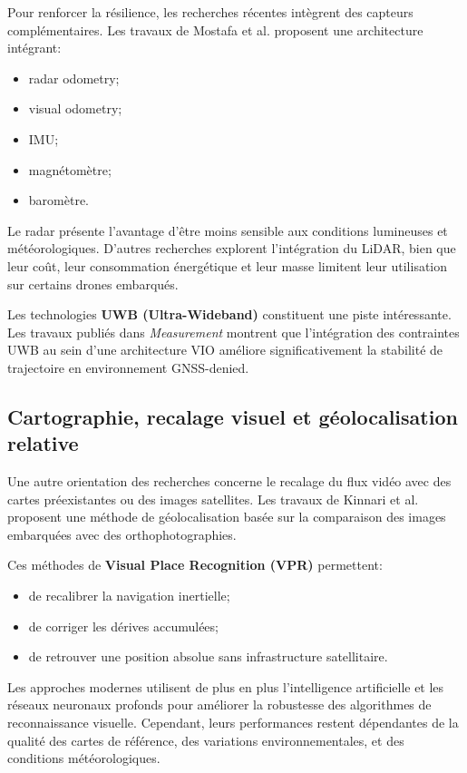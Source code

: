 \documentclass[12pt, a4paper, twoside, openright]{report}
\begin{document}
Pour renforcer la résilience, les recherches récentes intègrent des capteurs complémentaires. Les travaux de Mostafa et al.\cite{mostafa2022multi} proposent une architecture intégrant:
\begin{itemize}
    \item radar odometry;
    \item visual odometry;
    \item IMU;
    \item magnétomètre;
    \item baromètre.
\end{itemize}

Le radar présente l’avantage d’être moins sensible aux conditions lumineuses et météorologiques. D’autres recherches explorent l’intégration du LiDAR, bien que leur coût, leur consommation énergétique et leur masse limitent leur utilisation sur certains drones embarqués.

Les technologies \textbf{UWB (Ultra-Wideband)} constituent une piste intéressante. Les travaux publiés dans \textit{Measurement} montrent que l’intégration des contraintes UWB au sein d’une architecture VIO améliore significativement la stabilité de trajectoire en environnement GNSS-denied.

\subsection{Cartographie, recalage visuel et géolocalisation relative}
Une autre orientation des recherches concerne le recalage du flux vidéo avec des cartes préexistantes ou des images satellites. Les travaux de Kinnari et al.\cite{kinnari2020visual} proposent une méthode de géolocalisation basée sur la comparaison des images embarquées avec des orthophotographies.

Ces méthodes de \textbf{Visual Place Recognition (VPR)} permettent:
\begin{itemize}
    \item de recalibrer la navigation inertielle;
    \item de corriger les dérives accumulées;
    \item de retrouver une position absolue sans infrastructure satellitaire.
\end{itemize}

Les approches modernes utilisent de plus en plus l’intelligence artificielle et les réseaux neuronaux profonds pour améliorer la robustesse des algorithmes de reconnaissance visuelle. Cependant, leurs performances restent dépendantes de la qualité des cartes de référence, des variations environnementales, et des conditions météorologiques.
\end{document}
